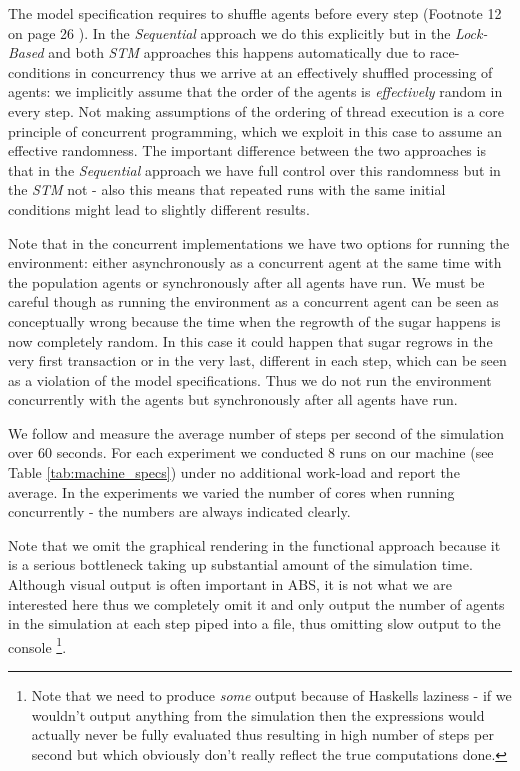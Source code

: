The model specification requires to shuffle agents before every step (Footnote 12 on page 26 \cite{epstein_growing_1996}). In the \textit{Sequential} approach we do this explicitly but in the \textit{Lock-Based} and both \textit{STM} approaches this happens automatically due to race-conditions in concurrency thus we arrive at an effectively shuffled processing of agents: we implicitly assume that the order of the agents is \textit{effectively} random in every step. Not making assumptions of the ordering of thread execution is a core principle of concurrent programming, which we exploit in this case to assume an effective randomness. The important difference between the two approaches is that in the \textit{Sequential} approach we have full control over this randomness but in the \textit{STM} not - also this means that repeated runs with the same initial conditions might lead to slightly different results.

Note that in the concurrent implementations we have two options for running the environment: either asynchronously as a concurrent agent at the same time with the population agents or synchronously after all agents have run. We must be careful though as running the environment as a concurrent agent can be seen as conceptually wrong because the time when the regrowth of the sugar happens is now completely random. In this case it could happen that sugar regrows in the very first transaction or in the very last, different in each step, which can be seen as a violation of the model specifications. Thus we do not run the environment concurrently with the agents but synchronously after all agents have run.

We follow \cite{lysenko_framework_2008} and measure the average number of steps per second of the simulation over 60 seconds. For each experiment we conducted 8 runs on our machine (see Table \ref{tab:machine_specs}) under no additional work-load and report the average. In the experiments we varied the number of cores when running concurrently - the numbers are always indicated clearly.

Note that we omit the graphical rendering in the functional approach because it is a serious bottleneck taking up substantial amount of the simulation time. Although visual output is often important in ABS, it is not what we are interested here thus we completely omit it and only output the number of agents in the simulation at each step piped into a file, thus omitting slow output to the console \footnote{Note that we need to produce \textit{some} output because of Haskells laziness - if we wouldn't output anything from the simulation then the expressions would actually never be fully evaluated thus resulting in high number of steps per second but which obviously don't really reflect the true computations done.}.

